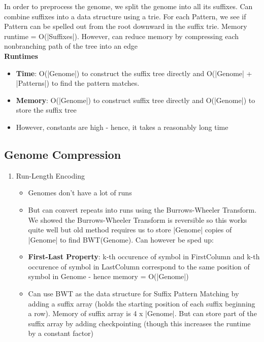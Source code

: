 \documentclass{article}
\newenvironment{cons}{\par\color{red}}{\par}
\begin{document}
In order to preprocess the genome, we split the genome into all its suffixes. Can combine suffixes into a data structure using a trie. For each Pattern, we see if Pattern can be spelled out from the root downward in the suffix trie. Memory runtime = O(|Suffixes|). However, can reduce memory by compressing each nonbranching path of the tree into an edge\\

\textbf{Runtimes}
\begin{itemize}
    \item \textbf{Time}: O(|Genome|) to construct the suffix tree directly and O(|Genome| + |Patterns|) to find the pattern matches. \textbf{}
    \item \textbf{Memory}: O(|Genome|) to construct suffix tree directly and O(|Genome|) to store the suffix tree
    \item However, constants are high - hence, it takes a reasonably long time
\end{itemize}

\subsection{Genome Compression}
\begin{enumerate}
    \item Run-Length Encoding
    \begin{itemize}
        \item \begin{cons}
        Genomes don't have a lot of runs
        \end{cons}
        \item But can convert repeats into runs using the Burrows-Wheeler Transform. We showed the Burrows-Wheeler Transform is reversible so this works quite well but old method requires us to store |Genome| copies of |Genome| to find BWT(Genome). Can however be sped up:
        \item \textbf{First-Last Property}: k-th occurence of symbol in FirstColumn and k-th occurence of symbol in LastColumn correspond to the same position of symbol in Genome - hence memory = O(|Genome|)
        \item Can use BWT as the data structure for Suffix Pattern Matching by adding a suffix array (holds the starting position of each suffix beginning a row). Memory of suffix array is 4 x |Genome|. But can store part of the suffix array by adding checkpointing (though this increases the runtime by a constant factor)
    \end{itemize}
    
\end{enumerate}
\end{document}
